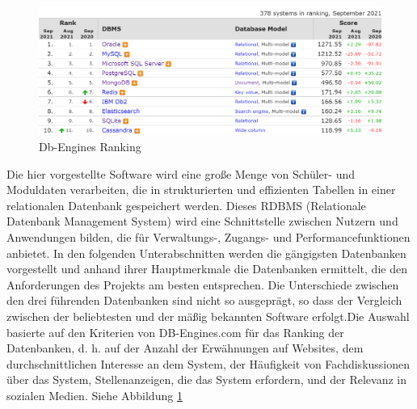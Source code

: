 \begin{figure}[h]
    \begin{center}
        \includegraphics[scale=0.5]{./pics/db_engines_ranking.png}
        \caption{Db-Engines Ranking}
        \label{db_engines_ranking}
    \end{center}
\end{figure}

Die hier vorgestellte Software wird eine große Menge von Schüler- und Moduldaten verarbeiten, die in strukturierten und effizienten Tabellen in einer relationalen
Datenbank gespeichert werden. Dieses RDBMS (Relationale Datenbank Management System) wird eine Schnittstelle zwischen Nutzern und Anwendungen bilden, die für Verwaltungs-,
Zugangs- und Performancefunktionen anbietet. In den folgenden Unterabschnitten werden die gängigsten Datenbanken vorgestellt und anhand ihrer Hauptmerkmale die Datenbanken ermittelt,
die den Anforderungen des Projekts am besten entsprechen. Die Unterschiede zwischen den drei führenden Datenbanken sind nicht so ausgeprägt, so dass der Vergleich zwischen
der beliebtesten und der mäßig bekannten Software erfolgt.Die Auswahl basierte auf den Kriterien von DB-Engines.com für das Ranking der Datenbanken,
d. h. auf der Anzahl der Erwähnungen auf Websites, dem durchschnittlichen Interesse an dem System, der Häufigkeit von Fachdiskussionen über das System, Stellenanzeigen,
die das System erfordern, und der Relevanz in sozialen Medien. Siehe Abbildung \ref{db_engines_ranking}